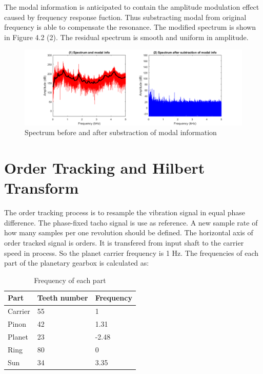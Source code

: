The modal information is anticipated to contain the amplitude modulation effect caused by frequency response fuction. Thus substracting modal from original frequency is able to compensate the resonance. The modified spectrum is shown in Figure 4.2 (2). The residual spectrum is smooth and uniform in amplitude.


\begin{figure}[h]
	\centering
	\includegraphics[scale =0.5]{composant}
	\caption{Spectrum before and after substraction of modal information}
	\label{composant}
\end{figure}

\section{Order Tracking and Hilbert Transform}

The order tracking process is to resample the vibration signal in equal phase difference. The phase-fixed tacho signal is use as reference. A new sample rate of how many samples per one revolution should be defined.
The horizontal axis of order tracked signal is orders. It is transfered from input shaft to the carrier speed in process. So the planet carrier frequency is 1 Hz. The frequencies of each part of the planetary gearbox is calculated as:

\begin{table}[h]
	\centering
	\caption{Frequency of each part}
	\label{gear frequencies}
	\begin{tabular}{p{80pt}p{80pt}p{80pt}}
		\toprule
		\textbf{Part} & \textbf{Teeth number} & \textbf{Frequency} \\ 
		\midrule
		Carrier & 55  & 1\\
		Pinon   & 42  & 1.31\\
		Planet  & 23  & -2.48\\
		Ring    & 80  & 0\\
		Sun     & 34  & 3.35\\
		\bottomrule
	\end{tabular}
\end{table}

